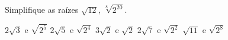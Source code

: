 Simplifique as raízes $\sqrt{12}$, $\sqrt[8]{2^{20}}$.

$2\sqrt{3}$ e $\sqrt{2^5}$
$2\sqrt{5}$ e $\sqrt{2^4}$
$3\sqrt{2}$ e $\sqrt{2}$
$2\sqrt{7}$ e $\sqrt{2^2}$
$\sqrt{11}$ e $\sqrt{2^8}$



